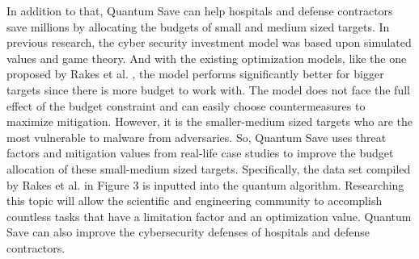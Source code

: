 In addition to that, Quantum Save can help hospitals and defense contractors save millions by allocating the budgets of small and medium sized targets. In previous research, the cyber security investment model was based upon simulated values and game theory. And with the existing optimization models, like the one proposed by Rakes et al. \cite{rakes_it_2012}, the model performs significantly better for bigger targets since there is more budget to work with. The model does not face the full effect of the budget constraint and can easily choose countermeasures to maximize mitigation. However, it is the smaller-medium sized targets who are the most vulnerable to malware from adversaries. So, Quantum Save uses threat factors and mitigation values from real-life case studies to improve the budget allocation of these small-medium sized targets. Specifically, the data set compiled by Rakes et al. \cite{rakes_it_2012} in Figure 3 is inputted into the quantum algorithm. Researching this topic will allow the scientific and engineering community to accomplish countless tasks that have a limitation factor and an optimization value. Quantum Save can also improve the cybersecurity defenses of hospitals and defense contractors. \\

